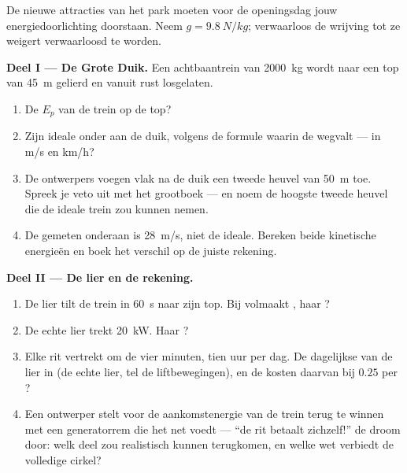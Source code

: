 \begin{problem}\label{pb:g9:energy-conversions:1}
De nieuwe attracties van het park moeten voor de openingsdag jouw
energiedoorlichting doorstaan. Neem $g = \qty{9.8}{N/kg}$;
verwaarloos de wrijving tot ze weigert verwaarloosd te worden.

\medskip\noindent\textbf{Deel I --- De Grote Duik.}
Een achtbaantrein van \qty{2000}{kg} wordt naar een top van \qty{45}{m}
gelierd en vanuit rust losgelaten.
\begin{enumerate}
  \item De $E_p$ van de trein op de top?
  \item Zijn ideale  onder aan de duik, volgens de formule
        waarin de  wegvalt --- in \unit{m/s} en \unit{km/h}?
  \item De ontwerpers voegen vlak na de duik een tweede heuvel van
        \qty{50}{m} toe. Spreek je veto uit met het grootboek --- en
        noem de hoogste tweede heuvel die de ideale trein zou kunnen
        nemen.
  \item De gemeten  onderaan is \qty{28}{m/s}, niet de
        ideale. Bereken beide kinetische energieën en boek het verschil
        op de juiste rekening.
\end{enumerate}

\medskip\noindent\textbf{Deel II --- De lier en de rekening.}
\begin{enumerate}[resume]
  \item De lier tilt de trein in \qty{60}{s} naar zijn top. Bij
        volmaakt , haar ?
  \item De echte lier trekt \qty{20}{kW}. Haar
        ?
  \item Elke rit vertrekt om de vier minuten, tien uur per dag.
        De dagelijkse  van de lier in
         (de echte lier, tel de liftbewegingen), en de
        kosten daarvan bij $0.25$ per ?
  \item Een ontwerper stelt voor de aankomstenergie van de trein
        terug te winnen met een generatorrem die het net voedt --- ``de
        rit betaalt zichzelf!''  de droom door: welk deel zou
        realistisch kunnen terugkomen, en welke wet verbiedt de
        volledige cirkel?
\end{enumerate}


\end{problem}
